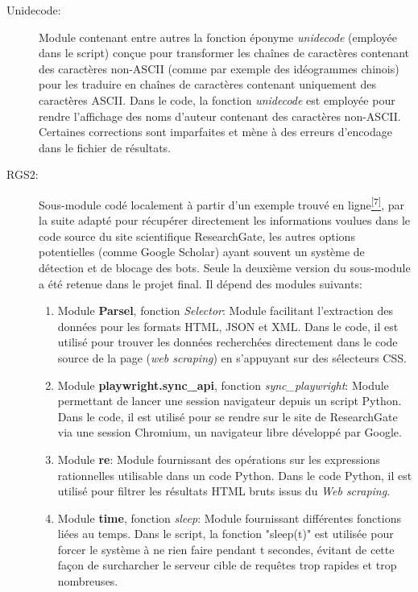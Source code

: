 \documentclass{book}
\begin{document}
\begin{description}
    \item[Unidecode:] Module contenant entre autres la fonction éponyme
        \textit{unidecode} (employée dans le script) conçue pour transformer les chaînes de
        caractères contenant des caractères non-ASCII (comme par exemple des
        idéogrammes chinois) pour les traduire en chaînes de caractères contenant
        uniquement des caractères ASCII. Dans le code, la fonction \textit{unidecode}
        est employée pour rendre l'affichage des noms d'auteur contenant des caractères
        non-ASCII. Certaines corrections sont imparfaites et mène à des erreurs d'encodage dans le fichier de résultats.

    \item[RGS2:] Sous-module codé localement à partir d'un exemple trouvé en
        ligne\hyperref[site6]{\textsuperscript{[7]}},
        par la suite adapté pour récupérer directement les informations
        voulues dans le code source du site scientifique ResearchGate, les autres
        options potentielles (comme Google Scholar) ayant souvent un système de
        détection et de blocage des bots. Seule la deuxième version du sous-module a
        été retenue dans le projet final. Il dépend des modules suivants:
        
    \begin{enumerate}
        \item Module \textbf{Parsel}, fonction \textit{Selector}: Module
                facilitant l'extraction des données pour les formats HTML, JSON et XML. Dans le
                code, il est utilisé pour trouver les données recherchées directement dans le
                code source de la page (\textit{web scraping}) en s'appuyant sur des sélecteurs CSS.
        \item Module \textbf{playwright.sync\_api}, fonction
                \textit{sync\_playwright}: Module permettant de lancer une session navigateur
                depuis un script Python. Dans le code, il est utilisé pour se rendre sur le
                site de ResearchGate via une session Chromium, un navigateur libre développé
                par Google.
        \item Module \textbf{re}: Module fournissant des opérations sur les
                expressions rationnelles utilisable dans un code Python. Dans le code Python, il est utilisé pour
                filtrer les résultats HTML bruts issus du \textit{Web scraping}.
        \item Module \textbf{time}, fonction \textit{sleep}: Module
                fournissant différentes fonctions liées au temps. Dans le script, la fonction
                "sleep(t)" est utilisée pour forcer le système à ne rien faire pendant t
                secondes, évitant de cette façon de surcharcher le serveur cible de requêtes
                trop rapides et trop nombreuses.
    \end{enumerate}
\end{description}
\end{document}

